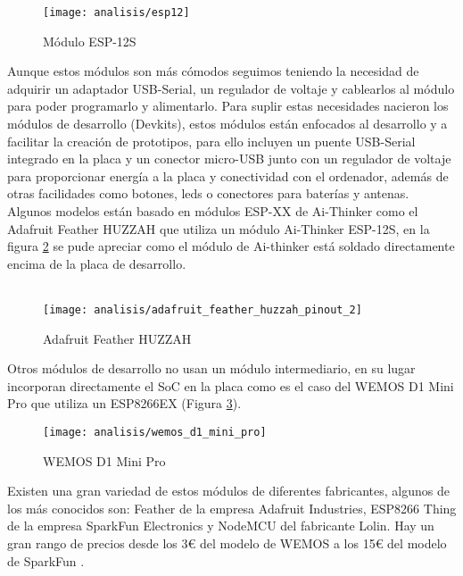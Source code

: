 \documentclass[../proyecto.tex]{subfiles}
\begin{document}
\begin{figure}[H]
\centering
\texttt{[image: analisis/esp12]}
\caption{Módulo ESP-12S}
\label{fig:esp12}
\end{figure}

\newpage

Aunque estos módulos son más cómodos seguimos teniendo la necesidad de adquirir un adaptador USB-Serial, un regulador de voltaje y cablearlos al módulo para poder programarlo y alimentarlo. Para suplir estas necesidades nacieron los módulos de desarrollo (Devkits), estos módulos están enfocados al desarrollo y a facilitar la creación de prototipos, para ello incluyen un puente USB-Serial integrado en la placa y un conector micro-USB junto con un regulador de voltaje para proporcionar energía a la placa y conectividad con el ordenador, además de otras facilidades como botones, leds o conectores para baterías y antenas.\\

Algunos modelos están basado en módulos ESP-XX de Ai-Thinker como el Adafruit Feather HUZZAH \cite{adafruit_feather_huzzah} que utiliza un módulo Ai-Thinker ESP-12S, en la figura \ref{fig:adafruit_feather_huzzah_pinout_2} se pude apreciar como el módulo de Ai-thinker está soldado directamente encima de la placa de desarrollo.\\~\\

\begin{figure}[H]
\centering
\texttt{[image: analisis/adafruit\_feather\_huzzah\_pinout\_2]}
\caption{Adafruit Feather HUZZAH}
\label{fig:adafruit_feather_huzzah_pinout_2}
\end{figure}

Otros módulos de desarrollo no usan un módulo intermediario, en su lugar incorporan directamente el SoC en la placa como es el caso del WEMOS D1 Mini Pro \cite{wemos_d1_mini_pro} que utiliza un ESP8266EX (Figura \ref{fig:wemos_d1_mini_pro}).\\

\begin{figure}[h]
\centering
\texttt{[image: analisis/wemos\_d1\_mini\_pro]}
\caption{WEMOS D1 Mini Pro}
\label{fig:wemos_d1_mini_pro}
\end{figure}

Existen una gran variedad de estos módulos de diferentes fabricantes, algunos de los más conocidos son:  Feather de la empresa Adafruit Industries, ESP8266 Thing de la empresa SparkFun Electronics y NodeMCU del fabricante Lolin. Hay un gran rango de precios desde los 3€ del modelo de WEMOS a los 15€ del modelo de SparkFun \cite{espressif_provider_digikey} \cite{espressif_provider_mouser}\cite{sparkfun_thing_official_page}.\\
\end{document}
